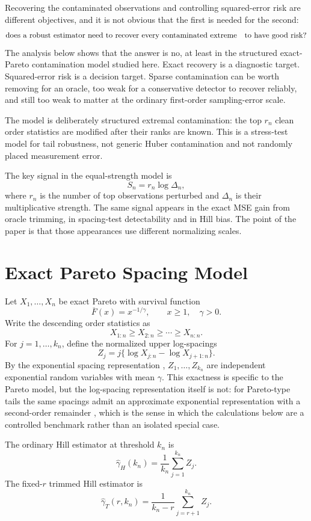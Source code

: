 \documentclass[11pt]{article}
\newcommand{\ghat}{\widehat{\gamma}}
\begin{document}
Recovering the contaminated observations and controlling squared-error risk are
different objectives, and it is not obvious that the first is needed for the
second:
\[
  \hbox{does a robust estimator need to recover every contaminated extreme}
  \quad
  \hbox{to have good risk?}
\]
The analysis below shows that the answer is no, at least in the structured
exact-Pareto contamination model studied here.  Exact recovery is a diagnostic
target.  Squared-error
risk is a decision target.  Sparse contamination can be worth removing for an
oracle, too weak for a conservative detector to recover reliably, and still too
weak to matter at the ordinary first-order sampling-error scale.

The model is deliberately structured extremal contamination: the top $r_n$
clean order statistics are modified after their ranks are known.  This is a
stress-test model for tail robustness, not generic Huber contamination and not
randomly placed measurement error.

The key signal in the equal-strength model is
\[
  S_n=r_n\log\Delta_n,
\]
where $r_n$ is the number of top observations perturbed and $\Delta_n$ is their
multiplicative strength.  The same signal appears in the exact MSE gain from
oracle trimming, in spacing-test detectability and in Hill bias.  The point of
the paper is that those appearances use different normalizing scales.

\section{Exact Pareto Spacing Model}

Let $X_1,\ldots,X_n$ be exact Pareto with survival function
\[
  \overline F(x)=x^{-1/\gamma},\qquad x\ge1,\quad \gamma>0.
\]
Write the descending order statistics as
\[
  X_{1:n}\ge X_{2:n}\ge\cdots\ge X_{n:n}.
\]
For $j=1,\ldots,k_n$, define the normalized upper log-spacings
\[
  Z_j=j\{\log X_{j:n}-\log X_{j+1:n}\}.
\]
By the exponential spacing representation \citep{renyi-1953},
$Z_1,\ldots,Z_{k_n}$ are independent exponential random variables with mean
$\gamma$.  This exactness is specific to the Pareto model, but the
log-spacing representation itself is not: for Pareto-type tails the same
spacings admit an approximate exponential representation with a second-order
remainder \citep{beirlant-dierckx-guillou-starica-2002}, which is the sense in
which the calculations below are a controlled benchmark rather than an
isolated special case.

The ordinary Hill estimator at threshold $k_n$ is
\[
  \ghat_H(k_n)=\frac1{k_n}\sum_{j=1}^{k_n}Z_j.
\]
The fixed-$r$ trimmed Hill estimator is
\[
  \ghat_T(r,k_n)=\frac1{k_n-r}\sum_{j=r+1}^{k_n}Z_j.
\]
\end{document}
